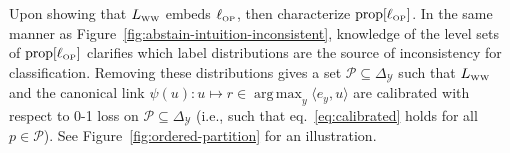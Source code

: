 \documentclass[11pt]{article}
\newcommand{\Comments}{1}
\newcommand{\mynote}[2]{\ifnum\Comments=1\textcolor{#1}{#2}\fi}
\newcommand{\jessie}[1]{\mynote{teal}{[JF: #1]}}
\newcommand{\prop}[1]{\mathrm{prop}[#1]}
\newcommand{\LWW}{L_{\text{\tiny WW}}}
\newcommand{\ellOP}{\ell_{\text{\tiny OP}}}
\newcommand{\mode}{\mathrm{mode}}
\newcommand{\simplex}{\Delta_\Y}
\renewcommand{\P}{\mathcal{P}}
\newcommand{\T}{\mathcal{T}}
\newcommand{\Y}{\mathcal{Y}}
\newcommand{\inprod}[2]{\langle #1, #2 \rangle}%
\DeclareMathOperator*{\argmax}{arg\,max}
\begin{document}
Upon showing that $\LWW$ embeds $\ellOP$, \citeauthor{wang2020weston} then characterize $\prop{\ellOP}$.
In the same manner as Figure~\ref{fig:abstain-intuition-inconsistent}, knowledge of the level sets of $\prop{\ellOP}$ clarifies which label distributions are the source of inconsistency for classification.
Removing these distributions gives a set $\P \subseteq \simplex$
such that $\LWW$ and the canonical link $\psi(u) : u \mapsto r \in \argmax_y \inprod{e_y}{u}$ are calibrated with respect to 0-1 loss on $\P \subseteq \simplex$ (i.e., such that eq.~\eqref{eq:calibrated} holds for all $p \in \P$).
See Figure~\ref{fig:ordered-partition} for an illustration.
\end{document}
